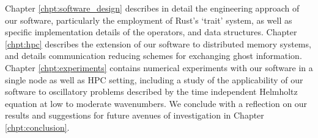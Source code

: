 Chapter \ref{chpt:software_design} describes in detail the engineering approach of our software, particularly the employment of Rust's `trait' system, as well as specific implementation details of the  operators, and data structures. Chapter \ref{chpt:hpc} describes the extension of our software to distributed memory systems, and details communication reducing schemes for exchanging ghost information. Chapter \ref{chpt:experiments} contains numerical experiments with our software in a single node as well as HPC setting, including a study of the applicability of our software to oscillatory problems described by the time independent Helmholtz equation at low to moderate wavenumbers. We conclude with a reflection on our results and suggestions for future avenues of investigation in Chapter \ref{chpt:conclusion}.


